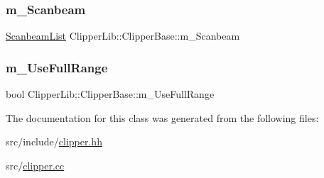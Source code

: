 \subsubsection{\texorpdfstring{m\_Scanbeam}{m\_Scanbeam}}
{\footnotesize\ttfamily \mbox{\hyperlink{class_clipper_lib_1_1_clipper_base_a517d04b2a0f0bae13a64a819b3bd429e}{Scanbeam\+List}} Clipper\+Lib\+::\+Clipper\+Base\+::m\+\_\+\+Scanbeam\hspace{0.3cm}{\ttfamily [protected]}}

\mbox{\label{class_clipper_lib_1_1_clipper_base_aea11d183617adc12d7ba2b84533f7f45}} 
\subsubsection{\texorpdfstring{m\_UseFullRange}{m\_UseFullRange}}
{\footnotesize\ttfamily bool Clipper\+Lib\+::\+Clipper\+Base\+::m\+\_\+\+Use\+Full\+Range\hspace{0.3cm}{\ttfamily [protected]}}



The documentation for this class was generated from the following files\+:\begin{DoxyCompactItemize}
\item 
src/include/\mbox{\hyperlink{clipper_8hh}{clipper.\+hh}}\item 
src/\mbox{\hyperlink{clipper_8cc}{clipper.\+cc}}\end{DoxyCompactItemize}
